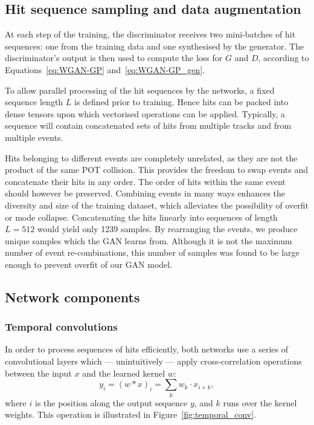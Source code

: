 

\subsection{Hit sequence sampling and data augmentation}
At each step of the training, the discriminator receives two mini-batches of hit
sequences: one from the training data and one synthesised by the generator. The
discriminator's output is then used to compute the loss for $G$ and $D$,
according to Equations~\ref{eq:WGAN-GP} and~\ref{eq:WGAN-GP_gen}.

To allow parallel processing of the hit sequences by the networks, a fixed
sequence length $L$ is defined prior to training. Hence hits can be packed
into dense tensors upon which vectorised operations can be applied. Typically, a
sequence will contain concatenated sets of hits from multiple tracks and from
multiple events.

Hits belonging to different events are completely unrelated, as they are not the
product of the same POT collision. This provides the freedom to swap events and
concatenate their hits in any order. The order of hits within the same event
should however be preserved. 
Combining events in many ways enhances the diversity and size of the training
dataset, which alleviates the possibility of overfit or mode collapse.
Concatenating the  hits linearly into sequences of length
$L=512$ would yield only 1239 samples. By rearranging the events, we produce
 unique samples which the GAN learns from. Although it is not
the maximum number of event re-combinations, this number of samples was found to
be large enough to prevent overfit of our GAN model.


\subsection{Network components}

\subsubsection{Temporal convolutions}
In order to process sequences of hits efficiently, both networks use a series of
convolutional layers which --- unintuitively --- apply cross-correlation
operations between the input $x$ and the learned kernel $w$:
\begin{equation}\label{eq:conv1d}
    y_{i} = (w \ast x)_{i} = \sum_{k} w_k \cdot x_{i+k},
\end{equation}
where $i$ is the position along the output sequence $y$, and $k$ runs over the
kernel weights. This operation is illustrated in Figure~\ref{fig:temporal_conv}.

